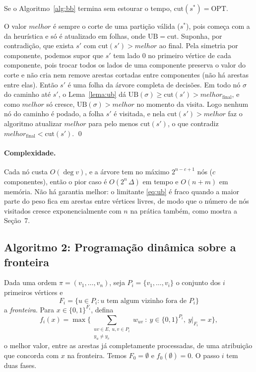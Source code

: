 \begin{teorema}[Correção]\label{teo:bb}
Se o Algoritmo~\ref{alg:bb} termina sem estourar o tempo, $\mathrm{cut}(s^*)=\mathrm{OPT}$.
\end{teorema}
\begin{prova}
O valor $\mathit{melhor}$ é sempre o corte de uma partição válida ($s^*$), pois começa com a da heurística e só é atualizado em folhas, onde $\mathrm{UB}=\mathrm{cut}$. Suponha, por contradição, que exista $s'$ com $\mathrm{cut}(s')>\mathit{melhor}$ ao final. Pela simetria por componente, podemos supor que $s'$ tem lado 0 no primeiro vértice de cada componente, pois trocar todos os lados de uma componente preserva o valor do corte e não cria nem remove arestas cortadas entre componentes (não há arestas entre elas). Então $s'$ é uma folha da árvore completa de decisões. Em todo nó $\sigma$ do caminho até $s'$, o Lema~\ref{lema:ub} dá $\mathrm{UB}(\sigma)\ge\mathrm{cut}(s')>\mathit{melhor}_{\text{final}}$, e como $\mathit{melhor}$ só cresce, $\mathrm{UB}(\sigma)>\mathit{melhor}$ no momento da visita. Logo nenhum nó do caminho é podado, a folha $s'$ é visitada, e nela $\mathrm{cut}(s')>\mathit{melhor}$ faz o algoritmo atualizar $\mathit{melhor}$ para pelo menos $\mathrm{cut}(s')$, o que contradiz $\mathit{melhor}_{\text{final}}<\mathrm{cut}(s')$. \qed
\end{prova}

\paragraph{Complexidade.} Cada nó custa $O(\deg v)$, e a árvore tem no máximo $2^{n-c+1}$ nós ($c$ componentes), então o pior caso é $O(2^{n}\,\Delta)$ em tempo e $O(n+m)$ em memória. Não há garantia melhor: o limitante \eqref{eq:ub} é fraco quando a maior parte do peso fica em arestas entre vértices livres, de modo que o número de nós visitados cresce exponencialmente com $n$ na prática também, como mostra a Seção~7.

\subsection{Algoritmo 2: Programação dinâmica sobre a fronteira}

Dada uma ordem $\pi=(v_1,\dots,v_n)$, seja $P_i=\{v_1,\dots,v_i\}$ o conjunto dos $i$ primeiros vértices e
\[F_i=\{u\in P_i : u \text{ tem algum vizinho fora de } P_i\}\]
a \emph{fronteira}. Para $x\in\{0,1\}^{F_i}$, defina
\begin{equation}
  f_i(x)=\max\Big\{\sum_{\substack{uv\in E,\ u,v\in P_i\\ y_u\ne y_v}} w_{uv}\ :\ y\in\{0,1\}^{P_i},\ y|_{F_i}=x\Big\},
\end{equation}
o melhor valor, entre as arestas já completamente processadas, de uma atribuição que concorda com $x$ na fronteira. Temos $F_0=\emptyset$ e $f_0(\emptyset)=0$. O passo $i$ tem duas fases.

